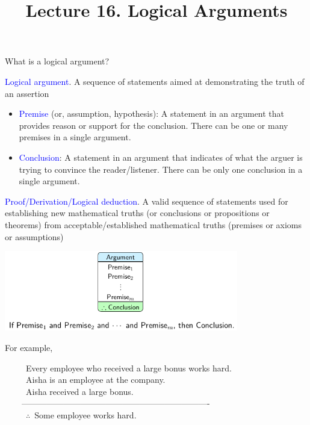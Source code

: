 \documentclass[aspectratio=169]{beamer}
\title{Lecture 16. Logical Arguments}
\date{``My theory says: if P, then Q. 
I design an experiment to see if Q obtains. 
It does. Therefore, P is true."\\
\medskip

\Blue{Is  this argument valid?}}
\providecommand{\Blue}[1]{\textcolor{blue}{#1}}
\newcommand\thfore{\mathord{\therefore}\,}
\begin{document}
\frame[plain]{\titlepage}

\begin{frame}[plain]{What is a logical argument?}


\Blue{Logical argument}. A sequence of statements aimed at demonstrating 
    the truth of an assertion
    
 \begin{itemize}
   \item \Blue{Premise} (or, assumption, hypothesis):
    A statement in an argument that provides reason or 
    support for the conclusion. There can be one or many premises 
    in a single argument.


   \item \Blue{Conclusion}: A statement in an argument that indicates 
    of what the arguer is trying to convince the reader/listener.
    There can be only one conclusion in a single argument.
  \end{itemize}
  

\Blue{Proof/Derivation/Logical deduction}. A valid sequence of statements 
used for establishing new mathematical truths (or conclusions or propositions or theorems) 
from acceptable/established mathematical truths (premises or axioms or assumptions)

\end{frame}

\begin{frame}[plain]{}

 \begin{center}
  \includegraphics[height=3.5cm]{./img/lecture16-fig1.png}
 \end{center}
 
 For example,
 \medskip
 
 \ \ \ \ \  Every employee who received a large bonus works hard.\\
\ \ \ \ \  Aisha is an employee at the company.\\
\ \ \ \ \ Aisha received a large bonus.\\
\ \ \ \  -------------------------------------------------------------------\\
\ \ \ \ \    $\thfore$ Some employee works hard. 
 
\end{frame}
\end{document}
